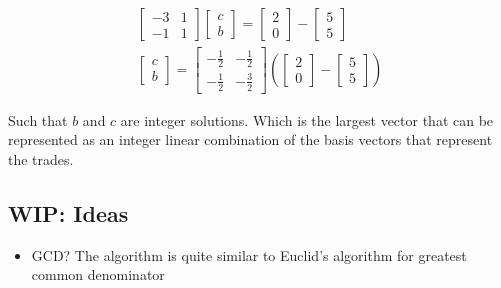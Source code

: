 \documentclass[letterpaper, 12pt]{article}
\begin{document}
\begin{align*}
\begin{bmatrix}
    -3 & 1\\
    -1 & 1
\end{bmatrix}
\begin{bmatrix}
    c\\
    b
\end{bmatrix}
=
\begin{bmatrix}
    2\\
    0
\end{bmatrix}
 -
\begin{bmatrix}
    5\\
    5
\end{bmatrix}
\\
\begin{bmatrix}
    c\\
    b
\end{bmatrix}
=
\begin{bmatrix}
    -\frac{1}{2} & -\frac{1}{2}\\
    -\frac{1}{2} & -\frac{3}{2}
\end{bmatrix}
(
\begin{bmatrix}
    2\\
    0
\end{bmatrix}
 -
\begin{bmatrix}
    5\\
    5
\end{bmatrix}
)
\end{align*}
\par Such that $b$ and $c$ are integer solutions.
Which is the largest vector that can be represented as an integer linear combination of the basis vectors that represent the trades.
\subsection{WIP: Ideas}
\begin{itemize}
    \item GCD? The algorithm is quite similar to Euclid's algorithm for greatest common denominator
\end{itemize}
\end{document}
